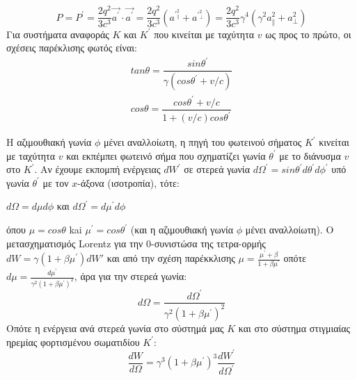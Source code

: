 $$  P=P^\prime =  \frac{2q^2 }{3c^3}  \vec{a^\prime}\cdot \vec{a^\prime} = \frac{2q^2 }{3c^3} ( a^\prime^2_{\parallel } + a^\prime^2_{\bot })  = \frac{2q^2 }{3c^3} \gamma^4 (\gamma^2 a^2_{\parallel } + a^2_{\bot }) $$
Για συστήματα αναφοράς $Κ$ και $Κ^\prime$ που κινείται με ταχύτητα $v$ ως προς το πρώτο, οι
σχέσεις παρέκλισης φωτός είναι\cite{1986rpa..book.....R}:
\begin{subequations}
\label{eq:aberration}
\begin{align}
tan \theta = \dfrac{sin\theta^\prime}{\gamma (cos \theta^\prime +v/c)}    \label{eq:aberrationA} \\ 
cos \theta = \dfrac{cos \theta^\prime +v/c}{1+(v/c)cos\theta^\prime}   \label{eq:aberrationB} 
\end{align}
\end{subequations}

Η αζιμουθιακή γωνία $\phi$ μένει αναλλοίωτη, η πηγή του φωτεινού σήματος $Κ^\prime$ κινείται με ταχύτητα $v$ και εκπέμπει φωτεινό σήμα που σχηματίζει γωνία $\theta^\prime $ με το διάνυσμα $v$ στο $Κ^\prime$.
Αν έχουμε εκπομπή ενέργειας $dW^\prime$ σε στερεά γωνία $d\Omega^\prime=sin\theta ^\prime d\theta^\prime d\phi^\prime$ υπό γωνία $\theta ^\prime $ με τον $x$-άξονα (ισοτροπία), τότε\cite{1986rpa..book.....R}:
\begin{center}
$ d\Omega = d\mu d\phi $ και   
$ d\Omega^\prime= d\mu ^\prime d\phi $
\end{center}
όπου $\mu = cos\theta$ kai $\mu^\prime = cos\theta^\prime$ (και η αζιμουθιακή γωνία $\phi$ μένει αναλλοίωτη). Ο μετασχηματισμός \textlatin{Lorentz} για την $0$-συνιστώσα της τετρα-ορμής $dW = \gamma(1+\beta \mu^\prime)dW'$ και από την σχέση παρέκκλισης $\mu = \frac{\mu^\prime+\beta}{1+\beta \mu^\prime}$ οπότε $d\mu = \frac{d\mu^\prime} {\gamma^2(1+\beta \mu^\prime)^2}$, άρα για την στερεά γωνία:
$$d\Omega = \frac{d\Omega^\prime} {\gamma^2(1+\beta \mu^\prime)^2}$$
Οπότε η ενέργεια ανά στερεά γωνία στο σύστημά μας $Κ$ και στο σύστημα στιγμιαίας ηρεμίας φορτισμένου σωματιδίου $K^\prime$:
$$  \dfrac{dW}{d\Omega} =\gamma^3(1+\beta \mu^\prime)^3 \dfrac{dW^\prime}{d\Omega^\prime} $$

